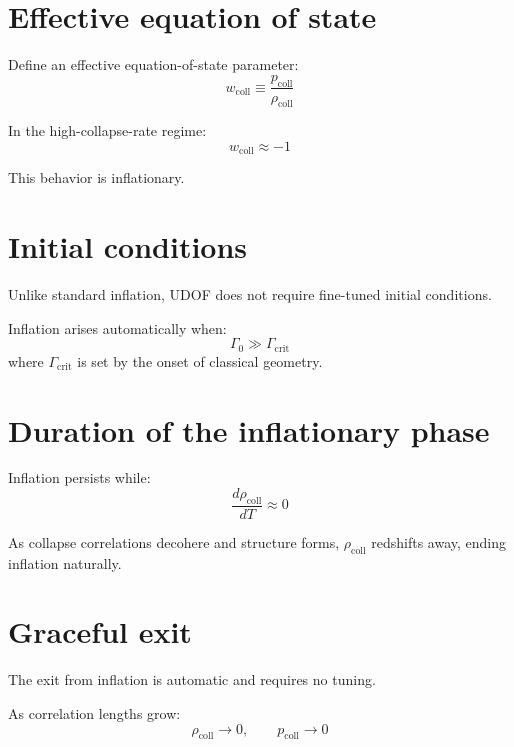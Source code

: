 \documentclass[11pt]{book}
\begin{document}
\section{Effective equation of state}

Define an effective equation-of-state parameter:
\begin{equation}
w_{\mathrm{coll}} \equiv
\frac{p_{\mathrm{coll}}}{\rho_{\mathrm{coll}}}
\end{equation}

In the high-collapse-rate regime:
\begin{equation}
w_{\mathrm{coll}} \approx -1
\end{equation}

This behavior is inflationary.

\section{Initial conditions}

Unlike standard inflation, UDOF does not require fine-tuned initial
conditions.

Inflation arises automatically when:
\begin{equation}
\Gamma_0 \gg \Gamma_{\mathrm{crit}}
\end{equation}
where $\Gamma_{\mathrm{crit}}$ is set by the onset of classical geometry.

\section{Duration of the inflationary phase}

Inflation persists while:
\begin{equation}
\frac{d\rho_{\mathrm{coll}}}{dT} \approx 0
\end{equation}

As collapse correlations decohere and structure forms,
$\rho_{\mathrm{coll}}$ redshifts away, ending inflation naturally.

\section{Graceful exit}

The exit from inflation is automatic and requires no tuning.

As correlation lengths grow:
\begin{equation}
\rho_{\mathrm{coll}} \to 0,
\qquad
p_{\mathrm{coll}} \to 0
\end{equation}
\end{document}
